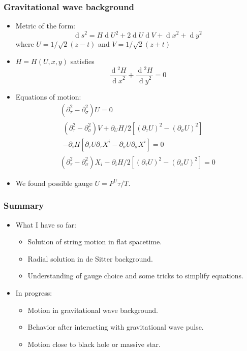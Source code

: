 \documentclass[aspectratio=43,serif]{beamer}
\newcommand{\D}[1]{\ensuremath{\operatorname{d}\!{#1}}}
\newcommand{\dif}[3][]{\frac{\D{{}^{#1}#2}}{\D{#3}^{#1}}}
\newcommand{\lp}{\left(}
\newcommand{\rp}{\right)}
\begin{document}
\begin{frame}
	\frametitle{Gravitational wave background}
	\begin{itemize}
		\item Metric of the form:
		$$
		\D s^2 = H \D U^2 + 2 \D U \D V + \D x^2 + \D y^2
		$$
		where $U = 1/\sqrt{2}(z-t)$ and $V = 1/\sqrt{2}(z+t)$
		\item $H = H(U, x, y)$ satisfies
		$$
		\dif[2] H x + \dif[2] H y = 0
		$$
		\item Equations of motion:
		\begin{gather*}
		\lp \partial_{\tau}^2 - \partial_{\sigma}^2 \rp U = 0 \\
		\begin{aligned}		
		\lp \partial_{\tau}^2 - \partial_{\sigma}^2 \rp V + \partial_U H /2 \left[ \lp \partial_{\tau} U \rp^2 - \lp \partial_{\sigma} U \rp^2 \right] \\
		- \partial_{i} H \left[ \partial_{\tau} U \partial_{\tau} {X^i} - \partial_{\sigma} U \partial_{\sigma} {X^i}\right] = 0
		\end{aligned} \\
		\lp \partial_{\tau}^2 - \partial_{\sigma}^2 \rp X_i - \partial_i H /2 \left[ \lp \partial_{\tau} U \rp^2 - \lp \partial_{\sigma} U \rp^2 \right] = 0
		\end{gather*}
		\item We found possible gauge $U = P^U\tau /T$.
	\end{itemize}
\end{frame}



\begin{frame}
	\frametitle{Summary}
	\begin{itemize}
		\item What I have so far:
		\begin{itemize}
			\item Solution of string motion in flat spacetime.
			\item Radial solution in de Sitter background.
			\item Understanding of gauge choice and some tricks to simplify equations.
		\end{itemize}
		\item In progress:
		\begin{itemize}
			\item Motion in gravitational wave background.
			\item Behavior after interacting with gravitational wave pulse.
			\item Motion close to black hole or massive star.
		\end{itemize}
	\end{itemize}
\end{frame}
\end{document}
